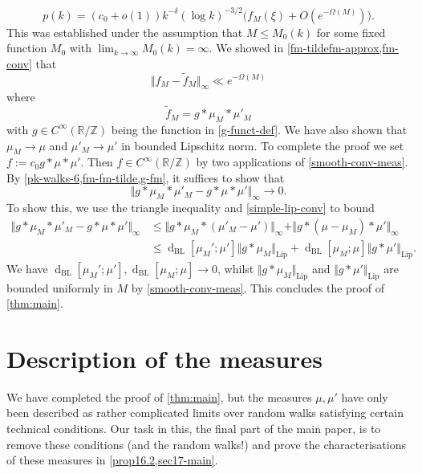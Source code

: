 \documentclass[11pt,reqno]{amsart}
\numberwithin{equation}{section}
\theoremstyle{definition}
\theoremstyle{remark}
\newcommand{\dist}[2]{{\operatorname{d}_{\operatorname{BL}}[#1;#2]}}
\renewcommand{\le}{\leqslant}
\newcommand\Z{\mathbb{Z}}
\newcommand\R{\mathbb{R}}
\newcommand\Lip{\operatorname{Lip}}
\begin{document}
\begin{equation}\label{pk-walks-6}  p(k) =  (c_0 + o(1))  k^{-\delta} (\log k)^{-3/2}  \big( f_{M}(\xi) +  O ( e^{-\Omega(M)}) \big).
\end{equation}
This was established under the assumption that $M \le M_0(k)$ for some fixed function $M_0$ with $\lim_{k \rightarrow \infty} M_0(k) = \infty$.
We showed in \cref{fm-tildefm-approx,fm-conv} that 
\begin{equation}\label{fm-fm-tilde} \Vert f_M - \tilde f_M \Vert_{\infty} \ll e^{-\Omega(M)}\end{equation}
where
\begin{equation}\label{g-fm}
 \tilde f_M = g \ast \mu_M \ast \mu'_M\end{equation}
with $g \in C^{\infty}(\R/\Z)$ being the function in \cref{g-funct-def}. We have also shown that $\mu_M \rightarrow \mu$ and $\mu'_M \rightarrow \mu'$ in bounded Lipschitz norm. To complete the proof we set $f := c_0 g \ast \mu \ast \mu'$. Then $f \in C^{\infty}(\R/\Z)$ by two applications of \cref{smooth-conv-meas}. By \cref{pk-walks-6,fm-fm-tilde,g-fm}, it suffices to show that 
\begin{equation*} \Vert g \ast \mu_M \ast \mu'_M - g \ast \mu \ast \mu' \Vert_{\infty} \rightarrow 0.\end{equation*}
To show this, we use the triangle inequality and \cref{simple-lip-conv} to bound
\begin{align*}
\Vert g \ast \mu_M \ast \mu'_M - g \ast \mu \ast \mu'\Vert_{\infty}   & \le \Vert  g \ast \mu_M \ast (\mu'_M - \mu') \Vert_{\infty} +  \Vert g \ast (\mu - \mu_M) \ast \mu' \Vert_{\infty} \\ & \le \dist{\mu_M'}{\mu'} \Vert g \ast \mu_M \Vert_{\Lip} +  \dist{\mu_M}{\mu} \Vert g \ast \mu'\Vert_{\Lip} .
\end{align*}
We have $\dist{\mu_M'}{\mu'}, \dist{\mu_M}{\mu} \rightarrow 0$, whilst $\Vert g \ast \mu_M \Vert_{\Lip}$ and $\Vert g \ast \mu' \Vert_{\Lip}$ are bounded uniformly in $M$ by \cref{smooth-conv-meas}. This concludes the proof of \cref{thm:main}.
 




\part{Description of the measures}\label{part5}
We have completed the proof of \cref{thm:main}, but the measures $\mu, \mu'$ have only been described as rather complicated limits over random walks satisfying certain technical conditions. Our task in this, the final part of the main paper, is to remove these conditions (and the random walks!) and prove the characterisations of these measures in \cref{prop16.2,sec17-main}.
\end{document}
